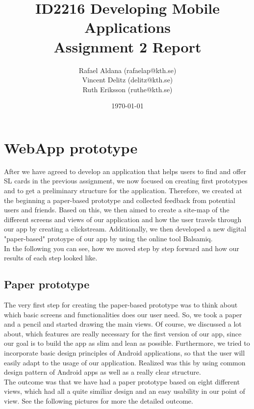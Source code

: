 \documentclass[11pt,twoside,a4paper]{report}
\begin{document}
\title{ID2216 Developing Mobile Applications\\Assignment 2 Report}
\author{Rafael Aldana (rafaelap@kth.se)\\Vincent Delitz (delitz@kth.se)\\Ruth Eriksson (ruthe@kth.se)}
\date{\today}
\maketitle

\newpage


\tableofcontents



\newpage

\chapter{WebApp prototype}

After we have agreed to develop an application that helps users to find and offer SL cards in the previous assignment, we now focused on creating first prototypes and to get a preliminary structure for the application. Therefore, we created at the beginning a paper-based prototype and collected feedback from potential users and friends. Based on this, we then aimed to create a site-map of the different screens and views of our application and how the user travels through our app by creating a clickstream. Additionally, we then developed a new digital "paper-based" protoype of our app by using the online tool Balsamiq. \\In the following you can see, how we moved step by step forward and how our results of each step looked like.

\section{Paper prototype}

The very first step for creating the paper-based prototype was to think about which basic screens and functionalities does our user need. So, we took a paper and a pencil and started drawing the main views. Of course, we discussed a lot about, which features are really necessary for the first version of our app, since our goal is to build the app as slim and lean as possible. Furthermore, we tried to incorporate basic design principles of Android applications, so that the user will easily adapt to the usage of our application. Realized was this by using common design pattern of Android apps as well as a really clear structure. \\The outcome was that we have had a paper prototype based on eight different views, which had all a quite similiar design and an easy usability in our point of view. See the following pictures for more the detailed outcome.
\end{document}
